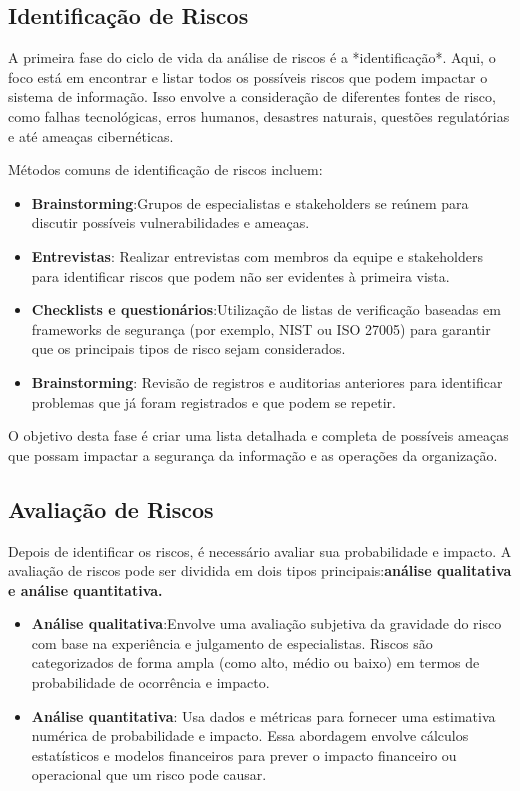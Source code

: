 \documentclass[12pt,oneside,a4paper,article]{abntex2}
\begin{document}
\subsection{Identificação de Riscos}
{A primeira fase do ciclo de vida da análise de riscos é a *identificação*. Aqui, o foco está em encontrar e listar todos os possíveis riscos que podem impactar o sistema de informação. Isso envolve a consideração de diferentes fontes de risco, como falhas tecnológicas, erros humanos, desastres naturais, questões regulatórias e até ameaças cibernéticas.

Métodos comuns de identificação de riscos incluem:}



\begin{itemize}
    \item \textbf{Brainstorming}:Grupos de especialistas e stakeholders se reúnem para discutir possíveis vulnerabilidades e ameaças.
    \item \textbf{Entrevistas}: Realizar entrevistas com membros da equipe e stakeholders para identificar riscos que podem não ser evidentes à primeira vista.
    \item \textbf{Checklists e questionários}:Utilização de listas de verificação baseadas em frameworks de segurança (por exemplo, NIST ou ISO 27005) para garantir que os principais tipos de risco sejam considerados.
    \item \textbf{Brainstorming}: Revisão de registros e auditorias anteriores para identificar problemas que já foram registrados e que podem se repetir.
\end{itemize}

{O objetivo desta fase é criar uma lista detalhada e completa de possíveis ameaças que possam impactar a segurança da informação e as operações da organização.}


\subsection{Avaliação de Riscos}
{Depois de identificar os riscos, é necessário avaliar sua probabilidade e impacto. A avaliação de riscos pode ser dividida em dois tipos principais:\textbf{análise qualitativa e análise quantitativa.}}

\begin{itemize}
\item \textbf{Análise qualitativa}:Envolve uma avaliação subjetiva da gravidade do risco com base na experiência e julgamento de especialistas. Riscos são categorizados de forma ampla (como alto, médio ou baixo) em termos de probabilidade de ocorrência e impacto.
    \item \textbf{Análise quantitativa}: Usa dados e métricas para fornecer uma estimativa numérica de probabilidade e impacto. Essa abordagem envolve cálculos estatísticos e modelos financeiros para prever o impacto financeiro ou operacional que um risco pode causar.
\end{itemize}
\end{document}
